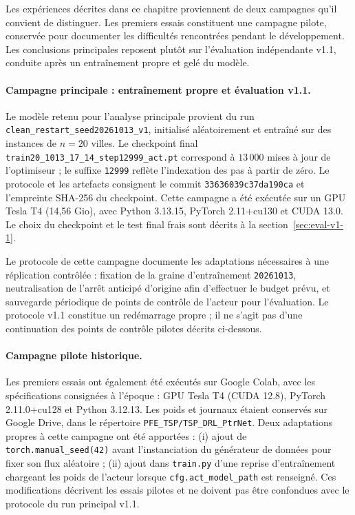 \documentclass[12pt, a4paper, twoside, openright]{book}
\begin{document}
Les expériences décrites dans ce chapitre proviennent de deux campagnes qu'il
convient de distinguer. Les premiers essais constituent une campagne pilote,
conservée pour documenter les difficultés rencontrées pendant le développement.
Les conclusions principales reposent plutôt sur l'évaluation indépendante
v1.1, conduite après un entraînement propre et gelé du modèle.

\paragraph{Campagne principale : entraînement propre et évaluation v1.1.}
Le modèle retenu pour l'analyse principale provient du run
\texttt{clean\_restart\_seed20261013\_v1}, initialisé aléatoirement et entraîné
sur des instances de $n=20$ villes. Le checkpoint final
\texttt{train20\_1013\_17\_14\_step12999\_act.pt} correspond à
$13\,000$ mises à jour de l'optimiseur ; le suffixe \texttt{12999} reflète
l'indexation des pas à partir de zéro. Le protocole et les artefacts consignent
le commit \texttt{33636039c37da190ca} et l'empreinte SHA-256 du checkpoint.
Cette campagne a été exécutée sur un GPU Tesla T4 (14,56 Gio), avec Python
3.13.15, PyTorch 2.11+cu130 et CUDA 13.0. Le choix du checkpoint et le test final
frais sont décrits à la section~\ref{sec:eval-v1-1}.

Le protocole de cette campagne documente les adaptations nécessaires à une
réplication contrôlée : fixation de la graine d'entraînement
\texttt{20261013}, neutralisation de l'arrêt anticipé d'origine afin d'effectuer
le budget prévu, et sauvegarde périodique de points de contrôle de l'acteur pour
l'évaluation. Le protocole v1.1 constitue un redémarrage propre ; il ne s'agit
pas d'une continuation des points de contrôle pilotes décrits ci-dessous.

\paragraph{Campagne pilote historique.}
Les premiers essais ont également été exécutés sur Google Colab, avec les
spécifications consignées à l'époque : GPU Tesla T4 (CUDA 12.8), PyTorch
2.11.0+cu128 et Python 3.12.13. Les poids et journaux étaient conservés sur
Google Drive, dans le répertoire \texttt{PFE\_TSP/TSP\_DRL\_PtrNet}. Deux
adaptations propres à cette campagne ont été apportées : (i) ajout de
\texttt{torch.manual\_seed(42)} avant l'instanciation du générateur de données
pour fixer son flux aléatoire ; (ii) ajout dans \texttt{train.py} d'une reprise
d'entraînement chargeant les poids de l'acteur lorsque
\texttt{cfg.act\_model\_path} est renseigné. Ces modifications décrivent les
essais pilotes et ne doivent pas être confondues avec le protocole du run
principal v1.1.
\end{document}

